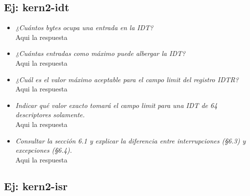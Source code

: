 \documentclass[a4paper, 12pt]{article}
\begin{document}
		\subsection{Ej: kern2-idt}
		\begin{itemize}
			\item \textit{¿Cuántos bytes ocupa una entrada en la IDT?\\}
			Aqui la respuesta\\
			\item \textit{¿Cuántas entradas como máximo puede albergar la IDT?\\}
			Aqui la respuesta\\
			\item \textit{¿Cuál es el valor máximo aceptable para el campo limit
			del registro IDTR?\\}
			Aqui la respuesta\\
			\item \textit{Indicar qué valor exacto tomará el campo limit para
			una IDT de 64 descriptores solamente.\\}
			Aqui la respuesta\\
			\item \textit{Consultar la sección 6.1 y explicar la diferencia
			entre interrupciones (§6.3) y excepciones (§6.4).\\}
			Aqui la respuesta\\
		\end{itemize}
		\subsection{Ej: kern2-isr}
\end{document}
